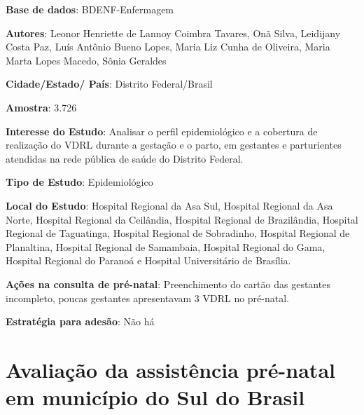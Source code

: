 \begin{description}
\item \textbf{Base de dados}: BDENF-Enfermagem
\item \textbf{Autores}:     Leonor Henriette de Lannoy Coimbra Tavares, Onã Silva, Leidijany Costa Paz, Luís Antônio Bueno Lopes, Maria Liz Cunha de Oliveira, Maria Marta Lopes Macedo, Sônia Geraldes
\item \textbf{Cidade/Estado/ País}: Distrito Federal/Brasil
\item \textbf{Amostra}: 3.726
\item \textbf{Interesse do Estudo}: Analisar o perfil epidemiológico e a cobertura de realização do VDRL durante a gestação e o parto, em gestantes e parturientes atendidas na rede pública de saúde do Distrito Federal.
\item \textbf{Tipo de Estudo}: Epidemiológico
\item \textbf{Local do Estudo}: Hospital Regional da Asa Sul, Hospital Regional da Asa Norte, Hospital Regional da Ceilândia, Hospital Regional de Brazilândia, Hospital Regional de Taguatinga, Hospital Regional de Sobradinho, Hospital Regional de Planaltina, Hospital Regional de Samambaia, Hospital Regional do Gama,  Hospital Regional do Paranoá e Hospital Universitário de Brasília.
\item \textbf{Ações na consulta de pré-natal}: Preenchimento do cartão das gestantes incompleto, poucas gestantes apresentavam 3 VDRL no pré-natal. 
\item \textbf{Estratégia para adesão}: Não há
\end{description}

\section{Avaliação da assistência pré-natal em município do Sul do Brasil \cite{segatto2015evaluation}}

